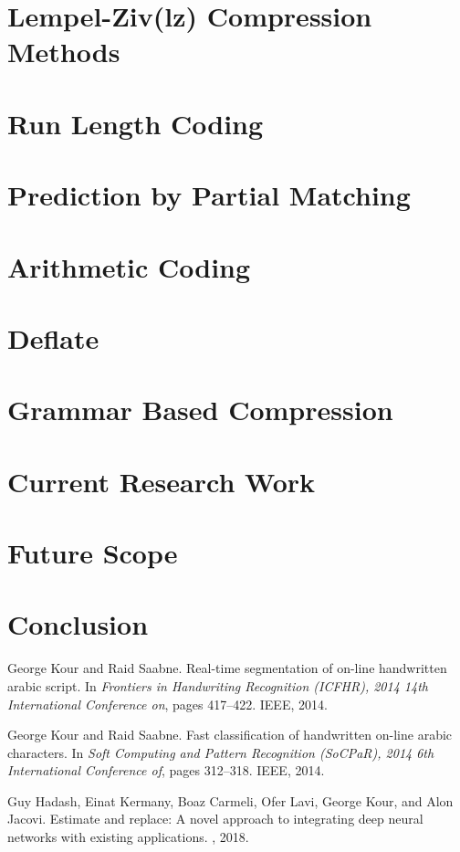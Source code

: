 \documentclass{article}
\begin{document}
\section{Lempel-Ziv(lz) Compression Methods}

\section{Run Length Coding}

\section{Prediction by Partial Matching}

\section{Arithmetic Coding}

\section{Deflate}

\section{Grammar Based Compression}

\section{Current Research Work}

\section{Future Scope}

\section{Conclusion}


\begin{thebibliography}{1}

George Kour and Raid Saabne.
\newblock Real-time segmentation of on-line handwritten arabic script.
\newblock In {\em Frontiers in Handwriting Recognition (ICFHR), 2014 14th
  International Conference on}, pages 417--422. IEEE, 2014.

George Kour and Raid Saabne.
\newblock Fast classification of handwritten on-line arabic characters.
\newblock In {\em Soft Computing and Pattern Recognition (SoCPaR), 2014 6th
  International Conference of}, pages 312--318. IEEE, 2014.

Guy Hadash, Einat Kermany, Boaz Carmeli, Ofer Lavi, George Kour, and Alon
  Jacovi.
\newblock Estimate and replace: A novel approach to integrating deep neural
  networks with existing applications.
, 2018.

\end{thebibliography}
\end{document}
